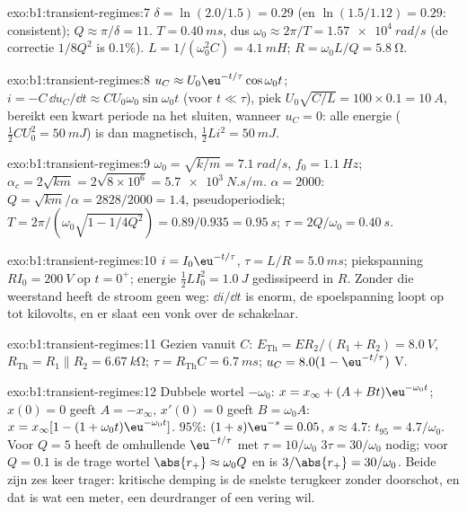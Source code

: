 \begin{solution}{exo:b1:transient-regimes:7}
$\delta = \ln(2.0/1.5) = 0.29$ (en $\ln(1.5/1.12) = 0.29$: consistent);
$Q \approx \pi/\delta = 11$. $T = \qty{0.40}{ms}$, dus $\omega_0 \approx
2\pi/T = \qty{1.57e4}{rad/s}$ (de correctie $1/8Q^2$ is $0.1\%$).
$L = 1/(\omega_0^2 C) = \qty{4.1}{mH}$; $R = \omega_0 L/Q = \qty{5.8}{\ohm}$.
\end{solution}

\begin{solution}{exo:b1:transient-regimes:8}
$u_C \approx U_0\eu^{-t/\tau}\cos\omega_0 t$; $i = -C\,\dd u_C/\dd t
\approx CU_0\omega_0\sin\omega_0 t$ (voor $t \ll \tau$), piek $U_0\sqrt{C/L}
= 100 \times 0.1 = \qty{10}{A}$, bereikt een kwart periode na het sluiten,
wanneer $u_C = 0$: alle energie ($\tfrac12 CU_0^2 = \qty{50}{mJ}$) is dan
magnetisch, $\tfrac12 Li^2 = \qty{50}{mJ}$.
\end{solution}

\begin{solution}{exo:b1:transient-regimes:9}
$\omega_0 = \sqrt{k/m} = \qty{7.1}{rad/s}$, $f_0 = \qty{1.1}{Hz}$;
$\alpha_c = 2\sqrt{km} = 2\sqrt{8\times10^6} = \qty{5.7e3}{N.s/m}$.
$\alpha = 2000$: $Q = \sqrt{km}/\alpha = 2828/2000 = 1.4$, pseudoperiodiek;
$T = 2\pi/(\omega_0\sqrt{1 - 1/4Q^2}) = 0.89/0.935 = \qty{0.95}{s}$;
$\tau = 2Q/\omega_0 = \qty{0.40}{s}$.
\end{solution}

\begin{solution}{exo:b1:transient-regimes:10}
$i = I_0\eu^{-t/\tau}$, $\tau = L/R = \qty{5.0}{ms}$; piekspanning
$RI_0 = \qty{200}{V}$ op $t = 0^+$; energie $\tfrac12 LI_0^2 = \qty{1.0}{J}$
gedissipeerd in $R$. Zonder die weerstand heeft de stroom geen weg:
$\dd i/\dd t$ is enorm, de spoelspanning loopt op tot kilovolts, en er slaat
een vonk over de schakelaar.
\end{solution}

\begin{solution}{exo:b1:transient-regimes:11}
Gezien vanuit $C$: $E_{\mathrm{Th}} = ER_2/(R_1 + R_2) = \qty{8.0}{V}$,
$R_{\mathrm{Th}} = R_1 \parallel R_2 = \qty{6.67}{k\ohm}$; $\tau =
R_{\mathrm{Th}}C = \qty{6.7}{ms}$; $u_C = 8.0(1 - \eu^{-t/\tau})$ V.
\end{solution}

\begin{solution}{exo:b1:transient-regimes:12}
Dubbele wortel $-\omega_0$: $x = x_\infty + (A + Bt)\eu^{-\omega_0 t}$;
$x(0) = 0$ geeft $A = -x_\infty$, $x'(0) = 0$ geeft $B = \omega_0 A$:
$x = x_\infty[1 - (1 + \omega_0 t)\eu^{-\omega_0 t}]$. $95\%$:
$(1 + s)\eu^{-s} = 0.05$, $s \approx 4.7$: $t_{95} = 4.7/\omega_0$. Voor
$Q = 5$ heeft de omhullende $\eu^{-t/\tau}$ met $\tau = 10/\omega_0$
$3\tau = 30/\omega_0$ nodig; voor $Q = 0.1$ is de trage wortel $\abs{r_+} \approx
\omega_0 Q$ en is $3/\abs{r_+} = 30/\omega_0$. Beide zijn zes keer trager:
kritische demping is de snelste terugkeer zonder doorschot, en dat is wat een
meter, een deurdranger of een vering wil.
\end{solution}

